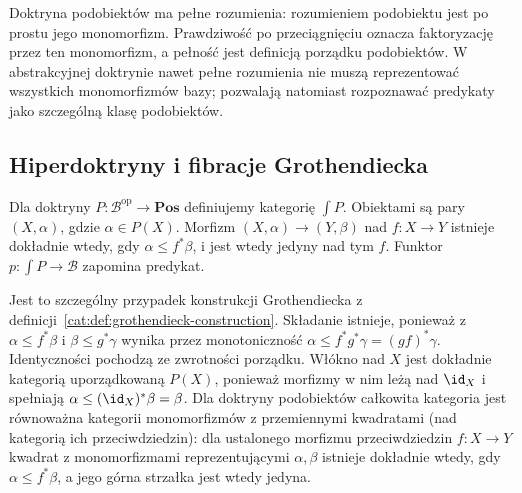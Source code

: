 Doktryna podobiektów ma pełne rozumienia: rozumieniem podobiektu jest po prostu jego monomorfizm. Prawdziwość po przeciągnięciu oznacza faktoryzację przez ten monomorfizm, a pełność jest definicją porządku podobiektów. W abstrakcyjnej doktrynie nawet pełne rozumienia nie muszą reprezentować wszystkich monomorfizmów bazy; pozwalają natomiast rozpoznawać predykaty jako szczególną klasę podobiektów.

\subsection{Hiperdoktryny i fibracje Grothendiecka}

\begin{definicja}\label{cat:def:cl-predicate-fibration}
Dla doktryny $P:\mathcal B^{\mathrm{op}}\to\mathbf{Pos}$ definiujemy kategorię $\int P$. Obiektami są pary $(X,\alpha)$, gdzie $\alpha\in P(X)$. Morfizm $(X,\alpha)\to(Y,\beta)$ nad $f:X\to Y$ istnieje dokładnie wtedy, gdy $\alpha\leq f^*\beta$, i jest wtedy jedyny nad tym $f$. Funktor $p:\int P\to\mathcal B$ zapomina predykat.
\end{definicja}

Jest to szczególny przypadek konstrukcji Grothendiecka z definicji~\ref{cat:def:grothendieck-construction}. Składanie istnieje, ponieważ z $\alpha\leq f^*\beta$ i $\beta\leq g^*\gamma$ wynika przez monotoniczność $\alpha\leq f^*g^*\gamma=(gf)^*\gamma$. Identyczności pochodzą ze zwrotności porządku. Włókno nad $X$ jest dokładnie kategorią uporządkowaną $P(X)$, ponieważ morfizmy w nim leżą nad $\id_X$ i spełniają $\alpha\leq(\id_X)^*\beta=\beta$. Dla doktryny podobiektów całkowita kategoria jest równoważna kategorii monomorfizmów z przemiennymi kwadratami (nad kategorią ich przeciwdziedzin): dla ustalonego morfizmu przeciwdziedzin $f:X\to Y$ kwadrat z monomorfizmami reprezentującymi $\alpha,\beta$ istnieje dokładnie wtedy, gdy $\alpha\leq f^*\beta$, a jego górna strzałka jest wtedy jedyna.

